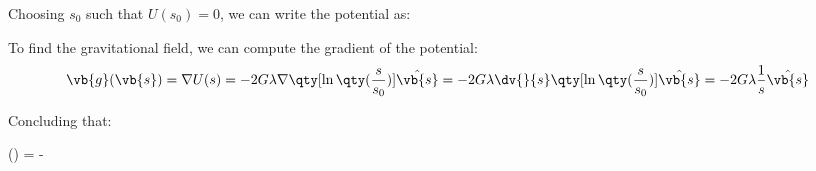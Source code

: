 Choosing $s_{0}$ such that $U(s_{0}) = 0$, we can write the potential as:

To find the gravitational field, we can compute the gradient of the potential:
\begin{equation*}
    \vb{g}(\vb{s}) = \nabla U(s) = -2G\lambda \nabla \qty[\ln\qty(\dfrac{s}{s_{0}})] \hat{\vb{s}} = -2G\lambda \dv{}{s}\qty[\ln\qty(\dfrac{s}{s_{0}})] \hat{\vb{s}} = -2G\lambda \frac{1}{s} \hat{\vb{s}}
\end{equation*}

Concluding that:
\begin{answer}
    () = - 
\end{answer}

\endex